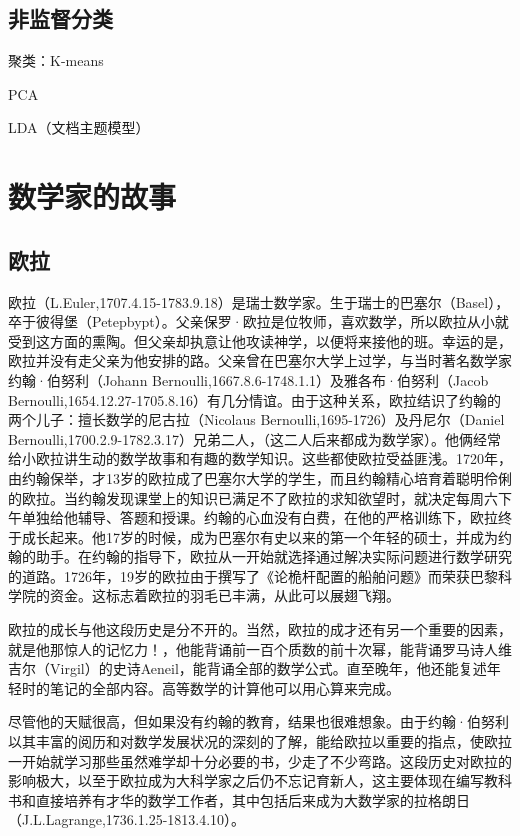 \documentclass[UTF8]{ctexart}
\begin{document}
\subsection{非监督分类}

聚类：K-means

PCA

LDA（文档主题模型）

\section{数学家的故事}

\subsection{欧拉}

欧拉（L.Euler,1707.4.15-1783.9.18）是瑞士数学家。生于瑞士的巴塞尔（Basel），卒于彼得堡（Petepbypt）。父亲保罗·欧拉是位牧师，喜欢数学，所以欧拉从小就受到这方面的熏陶。但父亲却执意让他攻读神学，以便将来接他的班。幸运的是，欧拉并没有走父亲为他安排的路。父亲曾在巴塞尔大学上过学，与当时著名数学家约翰·伯努利（Johann Bernoulli,1667.8.6-1748.1.1）及雅各布·伯努利（Jacob Bernoulli,1654.12.27-1705.8.16）有几分情谊。由于这种关系，欧拉结识了约翰的两个儿子：擅长数学的尼古拉（Nicolaus Bernoulli,1695-1726）及丹尼尔（Daniel Bernoulli,1700.2.9-1782.3.17）兄弟二人，（这二人后来都成为数学家）。他俩经常给小欧拉讲生动的数学故事和有趣的数学知识。这些都使欧拉受益匪浅。1720年，由约翰保举，才13岁的欧拉成了巴塞尔大学的学生，而且约翰精心培育着聪明伶俐的欧拉。当约翰发现课堂上的知识已满足不了欧拉的求知欲望时，就决定每周六下午单独给他辅导、答题和授课。约翰的心血没有白费，在他的严格训练下，欧拉终于成长起来。他17岁的时候，成为巴塞尔有史以来的第一个年轻的硕士，并成为约翰的助手。在约翰的指导下，欧拉从一开始就选择通过解决实际问题进行数学研究的道路。1726年，19岁的欧拉由于撰写了《论桅杆配置的船舶问题》而荣获巴黎科学院的资金。这标志着欧拉的羽毛已丰满，从此可以展翅飞翔。

欧拉的成长与他这段历史是分不开的。当然，欧拉的成才还有另一个重要的因素，就是他那惊人的记忆力！，他能背诵前一百个质数的前十次幂，能背诵罗马诗人维吉尔（Virgil）的史诗Aeneil，能背诵全部的数学公式。直至晚年，他还能复述年轻时的笔记的全部内容。高等数学的计算他可以用心算来完成。

尽管他的天赋很高，但如果没有约翰的教育，结果也很难想象。由于约翰·伯努利以其丰富的阅历和对数学发展状况的深刻的了解，能给欧拉以重要的指点，使欧拉一开始就学习那些虽然难学却十分必要的书，少走了不少弯路。这段历史对欧拉的影响极大，以至于欧拉成为大科学家之后仍不忘记育新人，这主要体现在编写教科书和直接培养有才华的数学工作者，其中包括后来成为大数学家的拉格朗日（J.L.Lagrange,1736.1.25-1813.4.10）。
\end{document}
